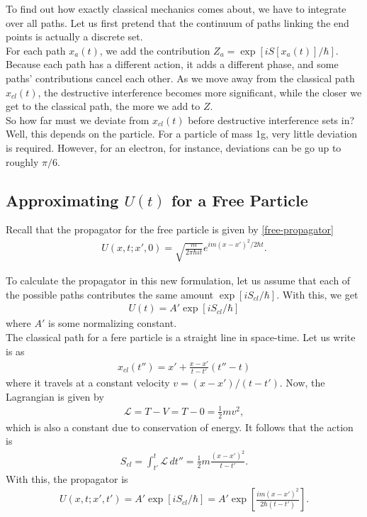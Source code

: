 \documentclass{book}
\theoremstyle{definition}
\newcommand{\lag}{\mathcal{L}}
\newcommand{\f}[2]{\frac{#1}{#2}}
\newcommand{\lb}{\left[}
\newcommand{\rb}{\right]}
\begin{document}
To find out how exactly classical mechanics comes about, we have to integrate over all paths. Let us first pretend that the continuum of paths linking the end points is actually a discrete set. \\

For each path $x_a(t)$, we add the contribution $Z_a = \exp[iS[x_a(t)]/\hbar]$. Because each path has a different action, it adds a different phase, and some paths' contributions cancel each other. As we move away from the classical path $x_{cl}(t)$, the destructive interference becomes more significant, while the closer we get to the classical path, the more we add to $Z$. \\

So how far must we deviate from $x_{cl}(t)$ before destructive interference sets in? Well, this depends on the particle. For a particle of mass 1g, very little deviation is required. However, for an electron, for instance, deviations can be go up to roughly $\pi/6$. 


\subsection{Approximating $U(t)$ for a Free Particle}

Recall that the propagator for the free particle is given by \eqref{free-propagator}
\begin{align}
U(x,t; x',0) = \sqrt{\f{m}{2\pi \hbar it}} e^{im(x-x')^2/2\hbar t}.
\end{align}

To calculate the propagator in this new formulation, let us assume that each of the possible paths contributes the same amount $\exp[iS_{cl}/\hbar]$. With this, we get
\begin{align}
U(t) = A' \exp[iS_{cl}/\hbar]
\end{align}
where $A'$ is some normalizing constant. \\

The classical path for a fere particle is a straight line in space-time. Let us write is as
\begin{align}
x_{cl}(t'') = x' + \f{x-x'}{t-t'}(t'' - t)
\end{align}
where it travels at a constant velocity $v = (x - x') / (t - t')$. Now, the Lagrangian is given by
\begin{align}
\lag = T - V = T - 0 = \f{1}{2}mv^2,
\end{align}
which is also a constant due to conservation of energy. It follows that the action is 
\begin{align}
S_{cl} = \int_{t'}^t \lag \,dt'' = \f{1}{2}m\f{(x-x')^2}{t-t'}.
\end{align}
With this, the propagator is 
\begin{align}
U(x,t;x',t') = A' \exp[iS_{cl}/\hbar] = A' \exp \lb \f{im(x-x')^2}{2\hbar (t - t')} \rb.
\end{align}
\end{document}
